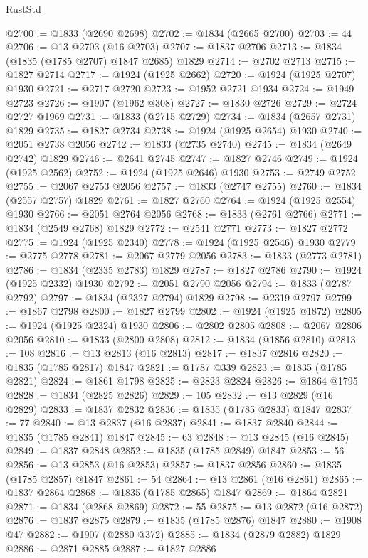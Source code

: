 \begin{lexlean}{RustStd}
\begin{coremodule}
@2700 := @1833 (@2690 @2698)
@2702 := @1834 (@2665 @2700)
@2703 := 44
@2706 := @13 @2703 (@16 @2703)
@2707 := @1837 @2706
@2713 := @1834 (@1835 (@1785 @2707) @1847 @2685) @1829
@2714 := @2702 @2713
@2715 := @1827 @2714
@2717 := @1924 (@1925 @2662)
@2720 := @1924 (@1925 @2707) @1930
@2721 := @2717 @2720
@2723 := @1952 @2721 @1934
@2724 := @1949 @2723
@2726 := @1907 (@1962 @308)
@2727 := @1830 @2726
@2729 := @2724 @2727 @1969
@2731 := @1833 (@2715 @2729)
@2734 := @1834 (@2657 @2731) @1829
@2735 := @1827 @2734
@2738 := @1924 (@1925 @2654) @1930
@2740 := @2051 @2738 @2056
@2742 := @1833 (@2735 @2740)
@2745 := @1834 (@2649 @2742) @1829
@2746 := @2641 @2745
@2747 := @1827 @2746
@2749 := @1924 (@1925 @2562)
@2752 := @1924 (@1925 @2646) @1930
@2753 := @2749 @2752
@2755 := @2067 @2753 @2056
@2757 := @1833 (@2747 @2755)
@2760 := @1834 (@2557 @2757) @1829
@2761 := @1827 @2760
@2764 := @1924 (@1925 @2554) @1930
@2766 := @2051 @2764 @2056
@2768 := @1833 (@2761 @2766)
@2771 := @1834 (@2549 @2768) @1829
@2772 := @2541 @2771
@2773 := @1827 @2772
@2775 := @1924 (@1925 @2340)
@2778 := @1924 (@1925 @2546) @1930
@2779 := @2775 @2778
@2781 := @2067 @2779 @2056
@2783 := @1833 (@2773 @2781)
@2786 := @1834 (@2335 @2783) @1829
@2787 := @1827 @2786
@2790 := @1924 (@1925 @2332) @1930
@2792 := @2051 @2790 @2056
@2794 := @1833 (@2787 @2792)
@2797 := @1834 (@2327 @2794) @1829
@2798 := @2319 @2797
@2799 := @1867 @2798
@2800 := @1827 @2799
@2802 := @1924 (@1925 @1872)
@2805 := @1924 (@1925 @2324) @1930
@2806 := @2802 @2805
@2808 := @2067 @2806 @2056
@2810 := @1833 (@2800 @2808)
@2812 := @1834 (@1856 @2810)
@2813 := 108
@2816 := @13 @2813 (@16 @2813)
@2817 := @1837 @2816
@2820 := @1835 (@1785 @2817) @1847
@2821 := @1787 @339
@2823 := @1835 (@1785 @2821)
@2824 := @1861 @1798
@2825 := @2823 @2824
@2826 := @1864 @1795
@2828 := @1834 (@2825 @2826)
@2829 := 105
@2832 := @13 @2829 (@16 @2829)
@2833 := @1837 @2832
@2836 := @1835 (@1785 @2833) @1847
@2837 := 77
@2840 := @13 @2837 (@16 @2837)
@2841 := @1837 @2840
@2844 := @1835 (@1785 @2841) @1847
@2845 := 63
@2848 := @13 @2845 (@16 @2845)
@2849 := @1837 @2848
@2852 := @1835 (@1785 @2849) @1847
@2853 := 56
@2856 := @13 @2853 (@16 @2853)
@2857 := @1837 @2856
@2860 := @1835 (@1785 @2857) @1847
@2861 := 54
@2864 := @13 @2861 (@16 @2861)
@2865 := @1837 @2864
@2868 := @1835 (@1785 @2865) @1847
@2869 := @1864 @2821
@2871 := @1834 (@2868 @2869)
@2872 := 55
@2875 := @13 @2872 (@16 @2872)
@2876 := @1837 @2875
@2879 := @1835 (@1785 @2876) @1847
@2880 := @1908 @47
@2882 := @1907 (@2880 @372)
@2885 := @1834 (@2879 @2882) @1829
@2886 := @2871 @2885
@2887 := @1827 @2886

\end{coremodule}
\end{lexlean}
